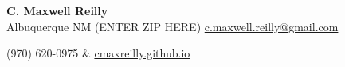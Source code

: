 \documentclass[letterpaper,11pt]{article}
\begin{document}

    \begin{center}
        \textbf{\Large C. Maxwell Reilly} \\ Albuquerque NM (ENTER ZIP HERE)
        \href{mailto:c.maxwell.reilly@gmail.com}{c.maxwell.reilly@gmail.com}
    \end{center}\vspace{-11pt}

    \begin{tabular*}
        {(970) 620-0975} & {\href{https://cmaxreilly.github.io}{cmaxreilly.github.io}}
    \end{tabular*}\vspace{-8pt}
\end{document}
